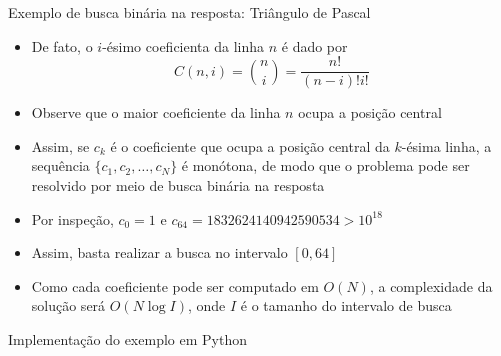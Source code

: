 \begin{frame}[fragile]{Exemplo de busca binária na resposta: Triângulo de Pascal}

    \begin{itemize}
        \item De fato, o $i$-ésimo coeficienta da linha $n$ é dado por
        $$
            C(n, i) = \binom{n}{i} = \frac{n!}{(n - i)!i!}
        $$

        \item Observe que o maior coeficiente da linha $n$ ocupa a posição central

        \item Assim, se $c_k$ é o coeficiente que ocupa a posição central da $k$-ésima linha, 
            a sequência $\{ c_1, c_2, \ldots, c_N\}$ é monótona, de modo que o problema pode ser
            resolvido por meio de busca binária na resposta

        \item Por inspeção, $c_0 = 1$ e $c_{64} = 1832624140942590534 > 10^{18}$

        \item Assim, basta realizar a busca no intervalo $[0, 64]$

        \item Como cada coeficiente pode ser computado em $O(N)$, a complexidade da solução será
            $O(N\log I)$, onde $I$ é o tamanho do intervalo de busca
    \end{itemize}

\end{frame}

\begin{frame}[fragile]{Implementação do exemplo em Python}
\end{frame}
